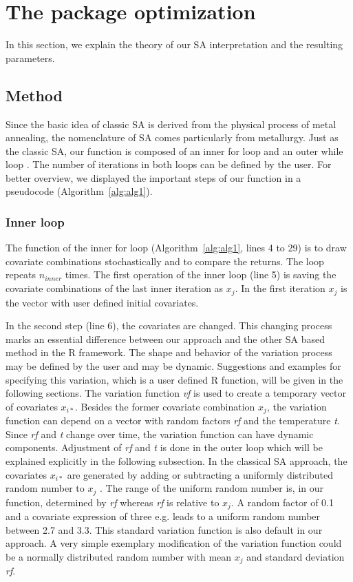 \section{The package optimization}
In this section, we explain the theory of our SA interpretation and the resulting parameters.

\subsection{Method}
\label{subsec:method}
Since the basic idea of classic SA is derived from the physical process of metal annealing, the nomenclature of SA comes particularly from metallurgy. Just as the classic SA, our function is composed of an inner for loop and an outer while loop \citep{kirkpatrick_1983}. The number of iterations in both loops can be defined by the user. For better overview, we displayed the important steps of our function in a pseudocode (Algorithm~\ref{alg:alg1}).

\subsubsection{Inner loop}
The function of the inner for loop (Algorithm~\ref{alg:alg1}, lines 4 to 29) is to draw covariate combinations stochastically and to compare the returns. The loop repeats $n_{inner}$ times. The first operation of the inner loop (line 5) is saving the covariate combinations of the last inner iteration as $x_j$. In the first iteration $x_j$ is the vector with user defined initial covariates.

In the second step (line 6), the covariates are changed. This changing process marks an essential difference between our approach and the other SA based method in the R framework. The shape and behavior of the variation process may be defined by the user and may be dynamic. Suggestions and examples for specifying this variation, which is a user defined R function, will be given in the following sections. The variation function \textit{vf} is used to create a temporary vector of covariates $x_{i*}$. Besides the former covariate combination $x_j$, the variation function can depend on a vector with random factors \textit{rf} and the temperature \textit{t}. Since \textit{rf} and \textit{t} change over time, the variation function can have dynamic components. Adjustment of \textit{rf} and \textit{t} is done in the outer loop which will be explained explicitly in the following subsection. In the classical SA approach, the covariates $x_{i*}$ are generated by adding or subtracting a uniformly distributed random number to $x_j$ \citep{kirkpatrick_1983}. The range of the uniform random number is, in our function, determined by \textit{rf} whereas \textit{rf} is relative to $x_j$. A random factor of 0.1 and a covariate expression of three e.g. leads to a uniform random number between 2.7 and 3.3. This standard variation function is also default in our approach. A very simple exemplary modification of the variation function could be a normally distributed random number with mean $x_j$ and standard deviation \textit{rf}.


